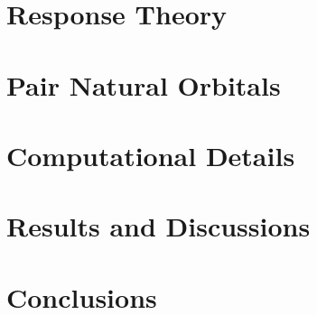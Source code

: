 %


\section{Response Theory}
\section{Pair Natural Orbitals}
\section{Computational Details}
\section{Results and Discussions}
\section{Conclusions}




%

